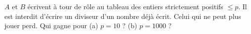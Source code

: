 $A$ et $B$ écrivent à tour de rôle au tableau des entiers strictement positifs $\leq p$. Il est interdit d'écrire un diviseur d'un nombre déjà écrit. Celui qui ne peut plus jouer perd. Qui gagne pour (a) $p = 10$ ? (b) $p = 1000$ ?
